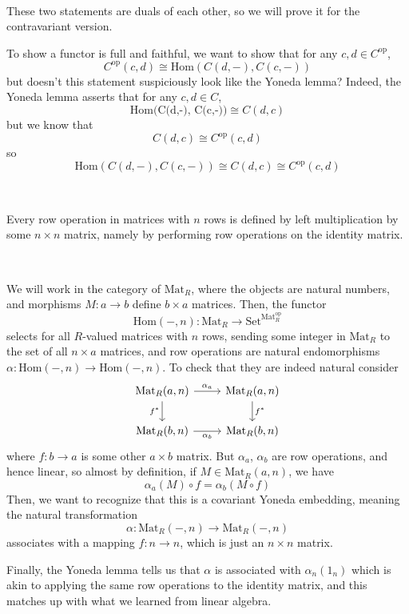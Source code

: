 \documentclass{article}
\begin{document}
\begin{customproof}
\

These two statements are duals of each other, so we will prove it for the contravariant version.

To show a functor is full and faithful, we want to show that for any $c, d \in C^\text{op}$, $$C^\text{op}(c,d) \cong \text{Hom}(C(d,-), C(c,-))$$but doesn't this statement suspiciously look like the Yoneda lemma? Indeed, the Yoneda lemma asserts that for any $c, d \in C$, $$\text{Hom(C(d,-), C(c,-))} \cong C(d,c)$$but we know that $$C(d,c) \cong C^\text{op}(c,d)$$so $$\text{Hom}(C(d,-), C(c,-))\cong C(d,c) \cong C^\text{op}(c,d) $$
\end{customproof}

\begin{corollary}
\

Every row operation in matrices with $n$ rows is defined by left multiplication by some $n \times n$ matrix, namely by performing row operations on the identity matrix.
\end{corollary}

\begin{customproof}
\

We will work in the category of $\text{Mat}_R$, where the objects are natural numbers, and morphisms $M: a\to b$ define $b \times a$ matrices. Then, the functor $$\text{Hom}(-, n): \text{Mat}_R \to \text{Set}^{\text{Mat}_R^\text{op}}$$selects for all $R$-valued matrices with $n$ rows, sending some integer in $\text{Mat}_R$ to the set of all $n \times a$ matrices, and row operations are natural endomorphisms $\alpha: \text{Hom}(-,n) \to \text{Hom}(-,n)$. To check that they are indeed natural consider \[\begin{tikzcd}
	\text{Mat}_R(a, n) & \text{Mat}_R(a, n)\\
	\text{Mat}_R(b, n) & \text{Mat}_R(b, n)
	\arrow[from=1-1, to=1-2, "\alpha_a"]
	\arrow[from=1-1, to=2-1, "f^*"']
	\arrow[from=2-1, to=2-2, "\alpha_b"']
	\arrow[from=1-2, to=2-2, "f^*"]
\end{tikzcd}\]where $f: b \to a$ is some other $a \times b$ matrix. But $\alpha_a$, $\alpha_b$ are row operations, and hence linear, so almost by definition, if $M \in \text{Mat}_R(a,n)$, we have $$\alpha_a(M) \circ f = \alpha_b(M \circ f)$$Then, we want to recognize that this is a covariant Yoneda embedding, meaning the natural transformation $$\alpha: \text{Mat}_R(-,n) \to \text{Mat}_R(-,n)$$ associates with a mapping $f: n \to n$, which is just an $n \times n$ matrix. 

Finally, the Yoneda lemma tells us that $\alpha$ is associated with $\alpha_n(1_n)$ which is akin to applying the same row operations to the identity matrix, and this matches up with what we learned from linear algebra.
\end{customproof}
\end{document}
